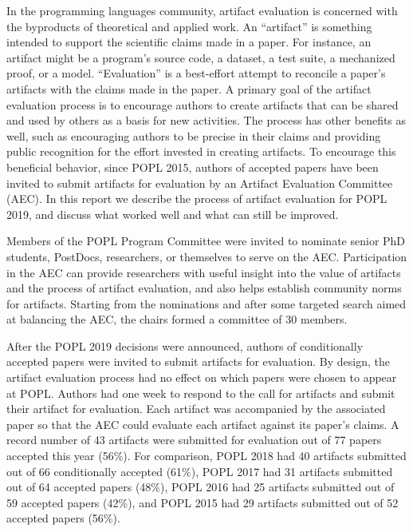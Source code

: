 \label{aec}

In the programming languages community, artifact evaluation is concerned with
the byproducts of theoretical and applied work. An ``artifact'' is something
intended to support the scientific claims made in a paper. For instance, an
artifact might be a program’s source code, a dataset, a test suite, a mechanized
proof, or a model. ``Evaluation'' is a best-effort attempt to reconcile a paper’s
artifacts with the claims made in the paper. A primary goal of the artifact
evaluation process is to encourage authors to create artifacts that can be
shared and used by others as a basis for new activities. The process has other
benefits as well, such as encouraging authors to be precise in their claims and
providing public recognition for the effort invested in creating artifacts. To
encourage this beneficial behavior, since POPL 2015, authors of accepted papers
have been invited to submit artifacts for evaluation by an Artifact Evaluation
Committee (AEC). In this report we describe the process of artifact evaluation
for POPL 2019, and discuss what worked well and what can still be improved.

Members of the POPL Program Committee were invited to nominate senior PhD
students, PostDocs, researchers, or themselves to serve on the AEC.
Participation in the AEC can provide researchers with useful insight into the
value of artifacts and the process of artifact evaluation, and also helps
establish community norms for artifacts. Starting from the nominations and after
some targeted search aimed at balancing the AEC, the chairs formed a committee
of 30 members.

After the POPL 2019 decisions were announced, authors of conditionally accepted
papers were invited to submit artifacts for evaluation. By design, the artifact
evaluation process had no effect on which papers were chosen to appear at POPL.
Authors had one week to respond to the call for artifacts and submit their
artifact for evaluation.
Each artifact was accompanied by the associated paper so that the AEC
could evaluate each artifact against its paper's claims. A record
number of 43 artifacts were submitted for evaluation out of 77 papers
accepted this year (56\%). For comparison,
POPL 2018 had 40 artifacts submitted out of 66 conditionally accepted (61\%),
POPL 2017 had 31 artifacts submitted out of 64 accepted papers (48\%),
POPL 2016 had 25 artifacts submitted out of 59 accepted papers (42\%), and
POPL 2015 had 29 artifacts submitted out of 52 accepted papers (56\%).

